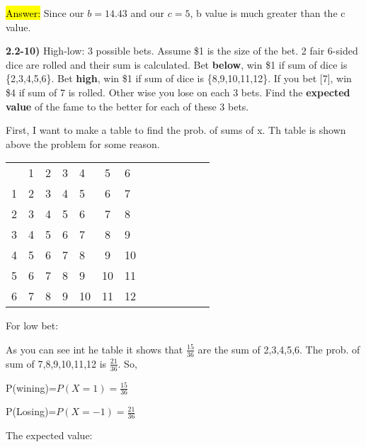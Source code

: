 \documentclass{article}
\begin{document}
\hl{Answer:} Since our $b=14.43$ and our $c=5$, b value is much greater than the c value.






\newpage
\textbf{2.2-10)} High-low: 3 possible bets. Assume \$1 is the size of the bet. 2 fair 6-sided dice are rolled and their sum is calculated. Bet \textbf{below}, win \$1 if sum of dice is \{2,3,4,5,6\}. Bet \textbf{high}, win \$1 if sum of dice is \{8,9,10,11,12\}. If you bet [7], win \$4 if sum of 7 is rolled. Other wise you lose on each 3 bets. Find the \textbf{expected value} of the fame to the better for each of these 3 bets.

\vspace{2mm}

First, I want to make a table to find the prob. of sums of x. Th table is shown above the problem for some reason.


\begin{table}
\begin{tabular}{l c l c l c l c l c l c | c |}
&1 & 2 & 3 & 4 & 5 & 6\\
1 & 2 & 3 & 4 & 5 & 6 & 7\\
2 & 3 & 4 & 5 & 6 & 7 & 8\\
3 & 4 & 5 & 6 & 7 & 8 & 9\\
4 & 5 & 6 & 7 & 8 & 9 & 10\\
5 & 6 & 7 & 8 & 9 & 10 & 11\\
6 & 7 & 8 & 9 & 10 & 11 & 12
\end{tabular}
\end{table}

For low bet:

\vspace{2mm}

As you can see int he table it shows that $\frac{15}{36}$ are the sum of 2,3,4,5,6. The prob. of sum of 7,8,9,10,11,12 is $\frac{21}{36}$. So,

\vspace{2mm}

P(wining)=$P(X=1)=\frac{15}{36}$

\vspace{2mm}

P(Losing)=$P(X=-1)=\frac{21}{36}$

\vspace{2mm}


The expected value:
\end{document}
